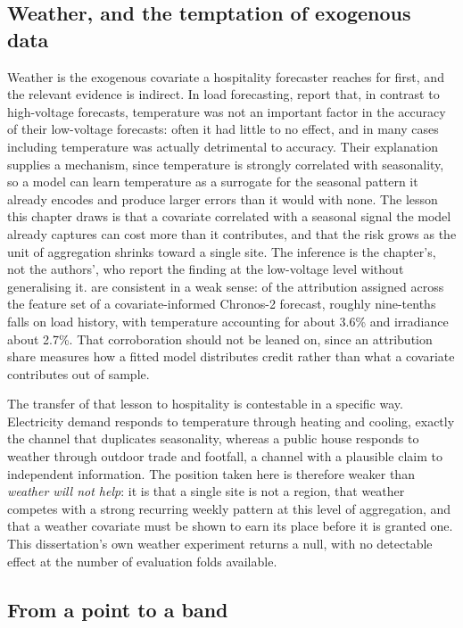 \subsection{Weather, and the temptation of exogenous data}

Weather is the exogenous covariate a hospitality forecaster reaches for first,
and the relevant evidence is indirect. In load forecasting,
\citet{haben_short_2019} report that, in contrast to high-voltage forecasts,
temperature was not an important factor in the accuracy of their low-voltage
forecasts: often it had little to no effect, and in many cases including
temperature was actually detrimental to accuracy. Their explanation supplies a
mechanism, since temperature is strongly correlated with seasonality, so a model
can learn temperature as a surrogate for the seasonal pattern it already encodes
and produce larger errors than it would with none. The lesson this chapter draws
is that a covariate correlated with a seasonal signal the model already captures
can cost more than it contributes, and that the risk grows as the unit of
aggregation shrinks toward a single site. The inference is the chapter's, not the
authors', who report the finding at the low-voltage level without generalising
it. \citet{hertel_explainable_2026} are consistent in a weak sense: of the
attribution assigned across the feature set of a covariate-informed Chronos-2
forecast, roughly nine-tenths falls on load history, with temperature accounting
for about 3.6\% and irradiance about 2.7\%. That corroboration should not be
leaned on, since an attribution share measures how a fitted model distributes
credit rather than what a covariate contributes out of sample.

The transfer of that lesson to hospitality is contestable in a specific way.
Electricity demand responds to temperature through heating and cooling, exactly
the channel that duplicates seasonality, whereas a public house responds to
weather through outdoor trade and footfall, a channel with a plausible claim to
independent information. The position taken here is therefore weaker than
\emph{weather will not help}: it is that a single site is not a region, that
weather competes with a strong recurring weekly pattern at this level of
aggregation, and that a weather covariate must be shown to earn its place before
it is granted one. This dissertation's own weather experiment returns a null,
with no detectable effect at the number of evaluation folds available.

\subsection{From a point to a band}

